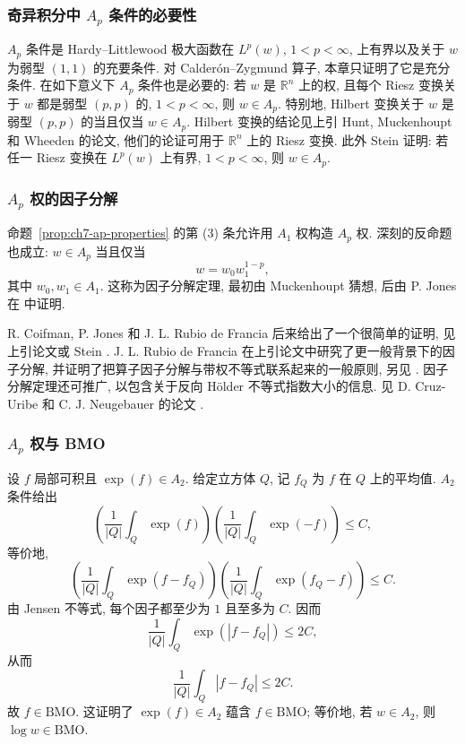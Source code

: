 \subsubsection{奇异积分中 $A_p$ 条件的必要性}
\label{subsec:ch7-ap-necessity-singular-integrals}

$A_p$ 条件是 Hardy--Littlewood 极大函数在 $L^p(w)$, $1<p<\infty$, 上有界以及关于 $w$ 为弱型 $(1,1)$ 的充要条件. 对 Calderón--Zygmund 算子, 本章只证明了它是充分条件. 在如下意义下 $A_p$ 条件也是必要的: 若 $w$ 是 $\mathbb R^n$ 上的权, 且每个 Riesz 变换关于 $w$ 都是弱型 $(p,p)$ 的, $1<p<\infty$, 则 $w\in A_p$. 特别地, Hilbert 变换关于 $w$ 是弱型 $(p,p)$ 的当且仅当 $w\in A_p$. Hilbert 变换的结论见上引 Hunt, Muckenhoupt 和 Wheeden 的论文, 他们的论证可用于 $\mathbb R^n$ 上的 Riesz 变换. 此外 Stein  证明: 若任一 Riesz 变换在 $L^p(w)$ 上有界, $1<p<\infty$, 则 $w\in A_p$.

\subsubsection{$A_p$ 权的因子分解}
\label{subsec:ch7-ap-factorization}

命题~\ref{prop:ch7-ap-properties} 的第 (3) 条允许用 $A_1$ 权构造 $A_p$ 权. 深刻的反命题也成立: $w\in A_p$ 当且仅当
\[
 w=w_0w_1^{1-p},
\]
其中 $w_0,w_1\in A_1$. 这称为因子分解定理, 最初由 Muckenhoupt 猜想, 后由 P. Jones 在  中证明.

\hypertarget{chapter-07-page-163}{}
R. Coifman, P. Jones 和 J. L. Rubio de Francia 后来给出了一个很简单的证明, 见上引论文或 Stein . J. L. Rubio de Francia 在上引论文中研究了更一般背景下的因子分解, 并证明了把算子因子分解与带权不等式联系起来的一般原则, 另见 . 因子分解定理还可推广, 以包含关于反向 Hölder 不等式指数大小的信息. 见 D. Cruz-Uribe 和 C. J. Neugebauer 的论文 .

\subsubsection{$A_p$ 权与 BMO}
\label{subsec:ch7-ap-bmo}

设 $f$ 局部可积且 $\exp(f)\in A_2$. 给定立方体 $Q$, 记 $f_Q$ 为 $f$ 在 $Q$ 上的平均值. $A_2$ 条件给出
\[
 \left(\frac1{|Q|}\int_Q\exp(f)\right)
 \left(\frac1{|Q|}\int_Q\exp(-f)\right)\le C,
\]
等价地,
\[
 \left(\frac1{|Q|}\int_Q\exp(f-f_Q)\right)
 \left(\frac1{|Q|}\int_Q\exp(f_Q-f)\right)\le C.
\]
由 Jensen 不等式, 每个因子都至少为 $1$ 且至多为 $C$. 因而
\[
 \frac1{|Q|}\int_Q\exp(|f-f_Q|)\le2C,
\]
从而
\[
 \frac1{|Q|}\int_Q|f-f_Q|\le2C.
\]
故 $f\in\mathrm{BMO}$. 这证明了 $\exp(f)\in A_2$ 蕴含 $f\in\mathrm{BMO}$; 等价地, 若 $w\in A_2$, 则 $\log w\in\mathrm{BMO}$.

